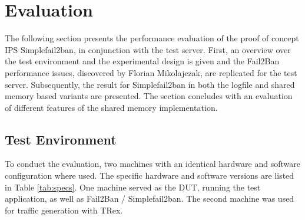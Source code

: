 
%

\chapter{Evaluation} \label{sec:evaluation}


The following section presents the performance evaluation of the proof of concept \ac{IPS} Simplefail2ban, in conjunction
with the test server. First, an overview over the test environment and the experimental design is given and the Fail2Ban performance
issues, discovered by Florian Mikolajczak, are replicated for the test server. Subsequently, the result for Simplefail2ban in both the logfile
and shared memory based variants are presented. The section concludes with an evaluation of different features of the shared memory implementation. 

\section{Test Environment}

To conduct the evaluation, two machines with an identical hardware and software configuration where used. The specific hardware and software versions are listed in Table \ref{tab:specs}.
One machine served as the \ac{DUT}, running the test application, as well as Fail2Ban / Simplefail2ban. The second machine was used for traffic generation with TRex.  

